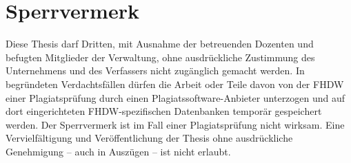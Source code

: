 \chapter*{Sperrvermerk}

Diese Thesis darf Dritten, mit Ausnahme der betreuenden Dozenten und befugten Mitglieder der Verwaltung, ohne ausdrückliche Zustimmung des Unternehmens und des Verfassers nicht zugänglich gemacht werden.
In begründeten Verdachtsfällen dürfen die Arbeit oder Teile davon von der FHDW einer Plagiatsprüfung durch einen Plagiatssoftware-Anbieter unterzogen und auf dort eingerichteten FHDW-spezifischen Datenbanken temporär gespeichert werden.
Der Sperrvermerk ist im Fall einer Plagiatsprüfung nicht wirksam.
Eine Vervielfältigung und Veröffentlichung der Thesis ohne ausdrückliche Genehmigung – auch in Auszügen – ist nicht erlaubt.
